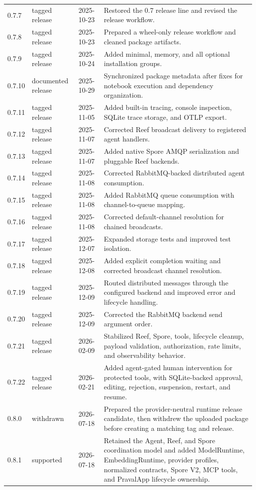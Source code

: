 \begin{tabular}{llll}
0.7.7 & tagged release & 2025-10-23 & Restored the 0.7 release line and revised the release workflow. \\
0.7.8 & tagged release & 2025-10-23 & Prepared a wheel-only release workflow and cleaned package artifacts. \\
0.7.9 & tagged release & 2025-10-24 & Added minimal, memory, and all optional installation groups. \\
0.7.10 & documented release & 2025-10-29 & Synchronized package metadata after fixes for notebook execution and dependency organization. \\
0.7.11 & tagged release & 2025-11-05 & Added built-in tracing, console inspection, SQLite trace storage, and OTLP export. \\
0.7.12 & tagged release & 2025-11-07 & Corrected Reef broadcast delivery to registered agent handlers. \\
0.7.13 & tagged release & 2025-11-07 & Added native Spore AMQP serialization and pluggable Reef backends. \\
0.7.14 & tagged release & 2025-11-08 & Corrected RabbitMQ-backed distributed agent consumption. \\
0.7.15 & tagged release & 2025-11-08 & Added RabbitMQ queue consumption with channel-to-queue mapping. \\
0.7.16 & tagged release & 2025-11-08 & Corrected default-channel resolution for chained broadcasts. \\
0.7.17 & tagged release & 2025-12-07 & Expanded storage tests and improved test isolation. \\
0.7.18 & tagged release & 2025-12-08 & Added explicit completion waiting and corrected broadcast channel resolution. \\
0.7.19 & tagged release & 2025-12-09 & Routed distributed messages through the configured backend and improved error and lifecycle handling. \\
0.7.20 & tagged release & 2025-12-09 & Corrected the RabbitMQ backend send argument order. \\
0.7.21 & tagged release & 2026-02-09 & Stabilized Reef, Spore, tools, lifecycle cleanup, payload validation, authorization, rate limits, and observability behavior. \\
0.7.22 & tagged release & 2026-02-21 & Added agent-gated human intervention for protected tools, with SQLite-backed approval, editing, rejection, suspension, restart, and resume. \\
0.8.0 & withdrawn & 2026-07-18 & Prepared the provider-neutral runtime release candidate, then withdrew the uploaded package before creating a matching tag and release. \\
0.8.1 & supported & 2026-07-18 & Retained the Agent, Reef, and Spore coordination model and added ModelRuntime, EmbeddingRuntime, provider profiles, normalized contracts, Spore V2, MCP tools, and PravalApp lifecycle ownership. \\
\hline
\end{tabular}
